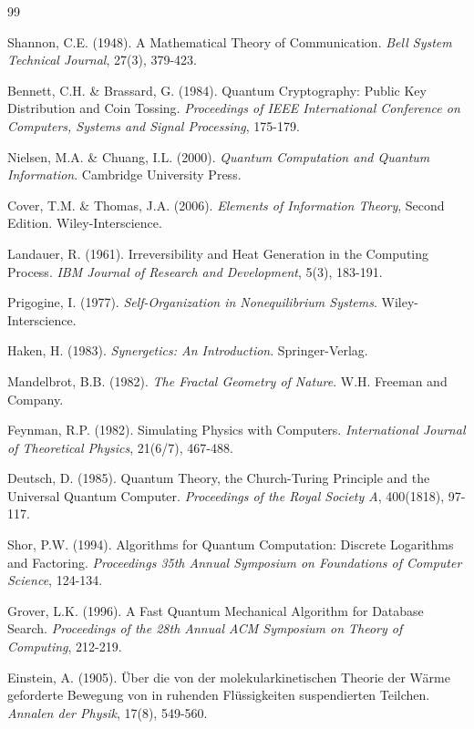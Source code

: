 \documentclass[12pt,a4paper]{article}
\begin{document}
\begin{thebibliography}{99}

Shannon, C.E. (1948). A Mathematical Theory of Communication. \textit{Bell System Technical Journal}, 27(3), 379-423.

Bennett, C.H. \& Brassard, G. (1984). Quantum Cryptography: Public Key Distribution and Coin Tossing. \textit{Proceedings of IEEE International Conference on Computers, Systems and Signal Processing}, 175-179.

Nielsen, M.A. \& Chuang, I.L. (2000). \textit{Quantum Computation and Quantum Information}. Cambridge University Press.

Cover, T.M. \& Thomas, J.A. (2006). \textit{Elements of Information Theory}, Second Edition. Wiley-Interscience.

Landauer, R. (1961). Irreversibility and Heat Generation in the Computing Process. \textit{IBM Journal of Research and Development}, 5(3), 183-191.

Prigogine, I. (1977). \textit{Self-Organization in Nonequilibrium Systems}. Wiley-Interscience.

Haken, H. (1983). \textit{Synergetics: An Introduction}. Springer-Verlag.

Mandelbrot, B.B. (1982). \textit{The Fractal Geometry of Nature}. W.H. Freeman and Company.

Feynman, R.P. (1982). Simulating Physics with Computers. \textit{International Journal of Theoretical Physics}, 21(6/7), 467-488.

Deutsch, D. (1985). Quantum Theory, the Church-Turing Principle and the Universal Quantum Computer. \textit{Proceedings of the Royal Society A}, 400(1818), 97-117.

Shor, P.W. (1994). Algorithms for Quantum Computation: Discrete Logarithms and Factoring. \textit{Proceedings 35th Annual Symposium on Foundations of Computer Science}, 124-134.

Grover, L.K. (1996). A Fast Quantum Mechanical Algorithm for Database Search. \textit{Proceedings of the 28th Annual ACM Symposium on Theory of Computing}, 212-219.

Einstein, A. (1905). Über die von der molekularkinetischen Theorie der Wärme geforderte Bewegung von in ruhenden Flüssigkeiten suspendierten Teilchen. \textit{Annalen der Physik}, 17(8), 549-560.


\end{thebibliography}
\end{document}
